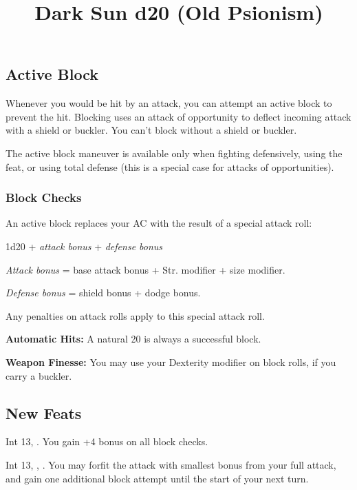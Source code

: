 \documentclass[twocolumn]{d20}
\title{Dark Sun d20 (Old Psionism)}
\begin{document}
\subsection{Active Block}
Whenever you would be hit by an attack, you can attempt an active block to prevent the hit. Blocking uses an attack of opportunity to deflect incoming attack with a shield or buckler. You can't block without a shield or buckler.

The active block maneuver is available only when fighting defensively, using the  feat, or using total defense (this is a special case for attacks of opportunities).

\subsubsection{Block Checks}
An active block replaces your AC with the result of a special attack roll:

\begin{Formula*}{1d20 + \textit{attack bonus} + \textit{defense bonus}}
  \item \textit{Attack bonus} = base attack bonus + Str. modifier + size modifier.
  \item \textit{Defense bonus} = shield bonus + dodge bonus.
\end{Formula*}

Any penalties on attack rolls apply to this special attack roll.

\textbf{Automatic Hits:} A natural 20 is always a successful block.

\textbf{Weapon Finesse:} You may use your Dexterity modifier on block rolls, if you carry a buckler.


\subsection{New Feats}

{Int 13, .}
{You gain +4 bonus on all block checks.}

{Int 13, , .}
{You may forfit the attack with smallest bonus from your full attack, and gain one additional block attempt until the start of your next turn.}
% 
% 
% 
\end{document}
